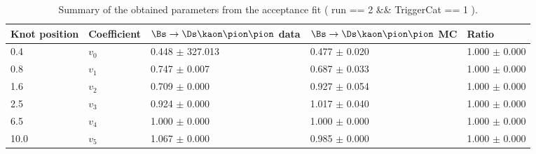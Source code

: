 \begin{table}[h]
\centering
\caption{Summary of the obtained parameters from the acceptance fit ( run == 2 && TriggerCat == 1 ).} 
\begin{tabular}{l l l l l}
\hline
\hline
Knot position & Coefficient & $\Bs\to\Ds\kaon\pion\pion$ data & $\Bs\to\Ds\kaon\pion\pion$ MC & Ratio \\
\hline
0.4 & $v_{0}$ & 0.448 $\pm$ 327.013 & 0.477 $\pm$ 0.020 & 1.000 $\pm$ 0.000\\
0.8 & $v_{1}$ & 0.747 $\pm$ 0.007 & 0.687 $\pm$ 0.033 & 1.000 $\pm$ 0.000\\
1.6 & $v_{2}$ & 0.709 $\pm$ 0.000 & 0.927 $\pm$ 0.054 & 1.000 $\pm$ 0.000\\
2.5 & $v_{3}$ & 0.924 $\pm$ 0.000 & 1.017 $\pm$ 0.040 & 1.000 $\pm$ 0.000\\
6.5 & $v_{4}$ & 1.000 $\pm$ 0.000 & 1.000 $\pm$ 0.000 & 1.000 $\pm$ 0.000\\
10.0 & $v_{5}$ & 1.067 $\pm$ 0.000 & 0.985 $\pm$ 0.000 & 1.000 $\pm$ 0.000\\
\hline
\hline
\end{tabular}
\label{table:splines}
\end{table}
